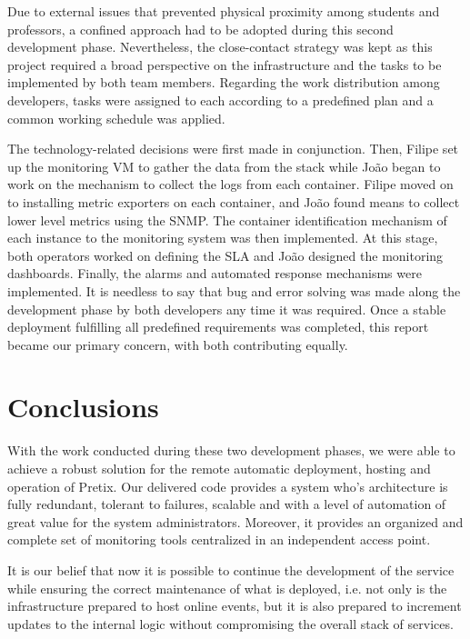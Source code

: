 \documentclass[12pt]{article}
\begin{document}

Due to external issues that prevented physical proximity among students and professors, a confined approach had to be adopted during this second development phase.
Nevertheless, the close-contact strategy was kept as this project required a broad perspective on the infrastructure and the tasks to be implemented by both team members.
Regarding the work distribution among developers, tasks were assigned to each according to a predefined plan and a common working schedule was applied.

The technology-related decisions were first made in conjunction.
Then, Filipe set up the monitoring VM to gather the data from the stack while João began to work on the mechanism to collect the logs from each container.
Filipe moved on to installing metric exporters on each container, and João found means to collect lower level metrics using the SNMP.
The container identification mechanism of each instance to the monitoring system was then implemented.
At this stage, both operators worked on defining the SLA and João designed the monitoring dashboards.
Finally, the alarms and automated response mechanisms were implemented.
It is needless to say that bug and error solving was made along the development phase by both developers any time it was required.
Once a stable deployment fulfilling all predefined requirements was completed, this report became our primary concern, with both contributing equally.

\section*{Conclusions} \label{conclusions} %

With the work conducted during these two development phases, we were able to achieve a robust solution for the remote automatic deployment, hosting and operation of Pretix.
Our delivered code provides a system who's architecture is fully redundant, tolerant to failures, scalable and with a level of automation of great value for the 
system administrators.
Moreover, it provides an organized and complete set of monitoring tools centralized in an independent access point.

It is our belief that now it is possible to continue the development of the service while ensuring the correct maintenance of what is deployed, i.e. not only 
is the infrastructure prepared to host online events, but it is also prepared to increment updates to the internal logic without compromising the overall stack 
of services.
\end{document}
